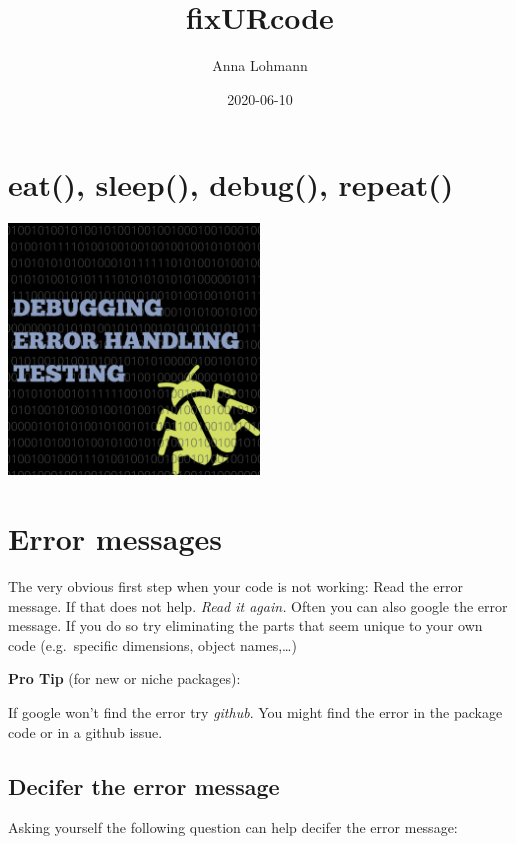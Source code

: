 \documentclass[]{book}
\title{fixURcode}
\author{Anna Lohmann}
\date{2020-06-10}
\begin{document}
\maketitle

{
\setcounter{tocdepth}{1}
\tableofcontents
}
\hypertarget{eat-sleep-debug-repeat}{%
\chapter{eat(), sleep(), debug(), repeat()}\label{eat-sleep-debug-repeat}}

\includegraphics[width=0.5\textwidth,height=\textheight]{img/invite.png}

\hypertarget{error-messages}{%
\chapter{Error messages}\label{error-messages}}

The very obvious first step when your code is not working:
Read the error message. If that does not help. \emph{Read it again.}
Often you can also google the error message.
If you do so try eliminating the parts that seem unique to your own code (e.g.~specific dimensions, object names,\ldots{})

\textbf{Pro Tip} (for new or niche packages):

If google won't find the error try \emph{github}.
You might find the error in the package code or in a github issue.

\hypertarget{decifer-the-error-message}{%
\section{Decifer the error message}\label{decifer-the-error-message}}

Asking yourself the following question can help decifer the error message:
\end{document}
